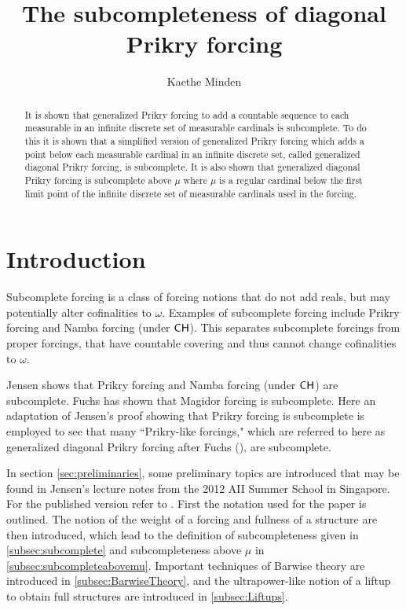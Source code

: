 \documentclass{amsart}
\theoremstyle{definition}
\theoremstyle{remark}
\newcommand{\CH}{\textup{\textsf{CH}}}
\begin{document}
\title{The subcompleteness of diagonal Prikry forcing}

\author[Minden]{Kaethe Minden}
 \address[K.~Minden]{Mathematics, Marlboro College, 2582 South Road, Marlboro, VT 05344}
\date{}     					

\begin{abstract}
It is shown that generalized Prikry forcing to add a countable sequence to each measurable in an infinite discrete set of measurable cardinals is subcomplete. To do this it is shown that a simplified version of generalized Prikry forcing which adds a point below each measurable cardinal in an infinite discrete set, called generalized diagonal Prikry forcing, is subcomplete. It is also shown that generalized diagonal Prikry forcing is subcomplete above $\mu$ where $\mu$ is a regular cardinal below the first limit point of the infinite discrete set of measurable cardinals used in the forcing.
\end{abstract}
\maketitle

\section{Introduction}
Subcomplete forcing is a class of forcing notions that do not add reals, but may potentially alter cofinalities to $\omega$. Examples of subcomplete forcing include Prikry forcing and Namba forcing (under $\CH$). This separates subcomplete forcings from proper forcings, that have countable covering and thus cannot change cofinalities to $\omega$. 

Jensen \cite[Section 3.3]{Jensen:2012fr} shows that Prikry forcing and Namba forcing (under $\CH$) are subcomplete. Fuchs has shown that Magidor forcing \cite{Fuchs:2017Magidor} is subcomplete. Here an adaptation of Jensen's proof showing that Prikry forcing is subcomplete is employed to see that many ``Prikry-like forcings," which are referred to here as generalized diagonal Prikry forcing after Fuchs (\cite{Fuchs:2005kx}), are subcomplete.

In section \ref{sec:preliminaries}, some preliminary topics are introduced that may be found in Jensen's lecture notes from the 2012 AII Summer School in Singapore. For the published version refer to \cite{Jensen:2012fr}. First the notation used for the paper is outlined. The notion of the weight of a forcing and fullness of a structure are then introduced, which lead to the definition of subcompleteness given in \ref{subsec:subcomplete} and subcompleteness above $\mu$ in \ref{subsec:subcompleteabovemu}. Important techniques of Barwise theory are introduced in \ref{subsec:BarwiseTheory}, and the ultrapower-like notion of a liftup to obtain full structures are introduced in \ref{subsec:Liftups}.
\end{document}
